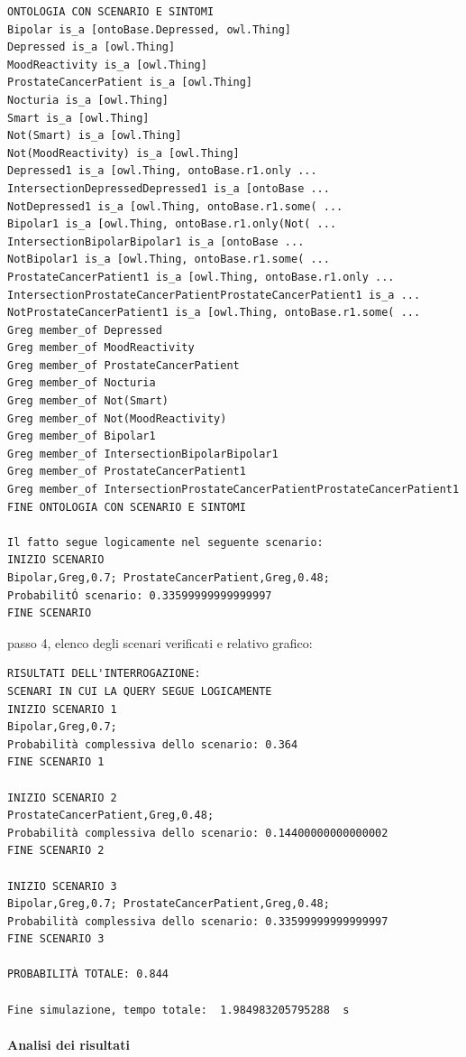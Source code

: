 \begin{verbatim}
ONTOLOGIA CON SCENARIO E SINTOMI
Bipolar is_a [ontoBase.Depressed, owl.Thing]
Depressed is_a [owl.Thing]
MoodReactivity is_a [owl.Thing]
ProstateCancerPatient is_a [owl.Thing]
Nocturia is_a [owl.Thing]
Smart is_a [owl.Thing]
Not(Smart) is_a [owl.Thing]
Not(MoodReactivity) is_a [owl.Thing]
Depressed1 is_a [owl.Thing, ontoBase.r1.only ...
IntersectionDepressedDepressed1 is_a [ontoBase ...
NotDepressed1 is_a [owl.Thing, ontoBase.r1.some( ...
Bipolar1 is_a [owl.Thing, ontoBase.r1.only(Not( ...
IntersectionBipolarBipolar1 is_a [ontoBase ...
NotBipolar1 is_a [owl.Thing, ontoBase.r1.some( ...
ProstateCancerPatient1 is_a [owl.Thing, ontoBase.r1.only ...
IntersectionProstateCancerPatientProstateCancerPatient1 is_a ...
NotProstateCancerPatient1 is_a [owl.Thing, ontoBase.r1.some( ...
Greg member_of Depressed
Greg member_of MoodReactivity
Greg member_of ProstateCancerPatient
Greg member_of Nocturia
Greg member_of Not(Smart)
Greg member_of Not(MoodReactivity)
Greg member_of Bipolar1
Greg member_of IntersectionBipolarBipolar1
Greg member_of ProstateCancerPatient1
Greg member_of IntersectionProstateCancerPatientProstateCancerPatient1
FINE ONTOLOGIA CON SCENARIO E SINTOMI

Il fatto segue logicamente nel seguente scenario: 
INIZIO SCENARIO
Bipolar,Greg,0.7; ProstateCancerPatient,Greg,0.48; 
ProbabilitÓ scenario: 0.33599999999999997
FINE SCENARIO
\end{verbatim}

\clearpage

passo 4, elenco degli scenari verificati e relativo grafico:
\begin{verbatim}
RISULTATI DELL'INTERROGAZIONE: 
SCENARI IN CUI LA QUERY SEGUE LOGICAMENTE
INIZIO SCENARIO 1
Bipolar,Greg,0.7; 
Probabilità complessiva dello scenario: 0.364
FINE SCENARIO 1

INIZIO SCENARIO 2
ProstateCancerPatient,Greg,0.48; 
Probabilità complessiva dello scenario: 0.14400000000000002
FINE SCENARIO 2

INIZIO SCENARIO 3
Bipolar,Greg,0.7; ProstateCancerPatient,Greg,0.48; 
Probabilità complessiva dello scenario: 0.33599999999999997
FINE SCENARIO 3

PROBABILITÀ TOTALE: 0.844

Fine simulazione, tempo totale:  1.984983205795288  s
\end{verbatim}

\paragraph{Analisi dei risultati} \hfill

